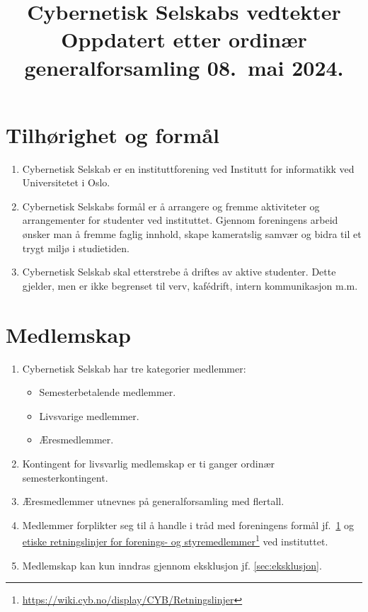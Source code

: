 \documentclass[8pt,norsk,a4paper]{article}
\title{\textbf{Cybernetisk Selskabs vedtekter} \\
	{\large Oppdatert etter ordinær generalforsamling 08.~mai 2024.}}
\date{}
\author{}
\newcommand\fhref[2]{%
	\href{#1}{#2}\footnote{\url{#1}}%
}
\begin{document}
\maketitle{}

\section{Tilhørighet og formål}\label{sec:formaal}
\begin{enumerate}
	\item{Cybernetisk Selskab er en instituttforening ved Institutt for informatikk ved Universitetet i Oslo.}
	\item{Cybernetisk Selskabs formål er å arrangere og fremme aktiviteter og arrangementer for studenter ved instituttet. Gjennom foreningens arbeid ønsker man å fremme faglig innhold, skape kameratslig samvær og bidra til et trygt miljø i studietiden.}
	\item{Cybernetisk Selskab skal etterstrebe å driftes av aktive studenter. Dette gjelder, men er ikke begrenset til verv, kafédrift, intern kommunikasjon m.m.}
\end{enumerate}

\section{Medlemskap}\label{sec:medlemskap}
\begin{enumerate}
	\item{Cybernetisk Selskab har tre kategorier medlemmer:}
	\begin{itemize}
		\item{Semesterbetalende medlemmer.}
		\item{Livsvarige medlemmer.}
		\item{Æresmedlemmer.}
	\end{itemize}
	\item{Kontingent for livsvarlig medlemskap er ti ganger ordinær semesterkontingent.}
	\item{Æresmedlemmer utnevnes på generalforsamling med  flertall.}
	\item Medlemmer forplikter seg til å handle i tråd med foreningens formål jf.~\ref{sec:formaal} og \fhref{https://wiki.cyb.no/display/CYB/Retningslinjer}{etiske retningslinjer for forenings- og styremedlemmer} ved instituttet\footnotemark.\label{item:forpliktelser}
	\item Medlemskap kan kun inndras gjennom eksklusjon jf. \ref{sec:eksklusjon}.
\end{enumerate}
\end{document}

